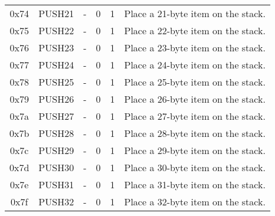 \documentclass[10pt,a4paper,leqno,bibliography=totoc]{scrartcl}
\newenvironment{alphafootnotes}
{\par\edef\savedfootnotenumber{\number\value{footnote}}
\renewcommand{\thefootnote}{\alph{footnote}}
\setcounter{footnote}{0}}
{\par\setcounter{footnote}{\savedfootnotenumber}}
\begin{document}
\begin{alphafootnotes}
\begin{longtable}{|cP{2.8cm}cccp{6cm}|}
			0x74 & PUSH21 & - & 0 & 1 & Place a 21-byte item on the stack. \\
			0x75 & PUSH22 & - & 0 & 1 & Place a 22-byte item on the stack. \\
			0x76 & PUSH23 & - & 0 & 1 & Place a 23-byte item on the stack. \\
			0x77 & PUSH24 & - & 0 & 1 & Place a 24-byte item on the stack. \\
			0x78 & PUSH25 & - & 0 & 1 & Place a 25-byte item on the stack. \\
			0x79 & PUSH26 & - & 0 & 1 & Place a 26-byte item on the stack. \\
			0x7a & PUSH27 & - & 0 & 1 & Place a 27-byte item on the stack. \\
			0x7b & PUSH28 & - & 0 & 1 & Place a 28-byte item on the stack. \\
			0x7c & PUSH29 & - & 0 & 1 & Place a 29-byte item on the stack. \\
			0x7d & PUSH30 & - & 0 & 1 & Place a 30-byte item on the stack. \\
			0x7e & PUSH31 & - & 0 & 1 & Place a 31-byte item on the stack. \\
			0x7f & PUSH32 & - & 0 & 1 & Place a 32-byte item on the stack. \\			
			\hline
			\end{longtable}


\end{alphafootnotes}
\end{document}
